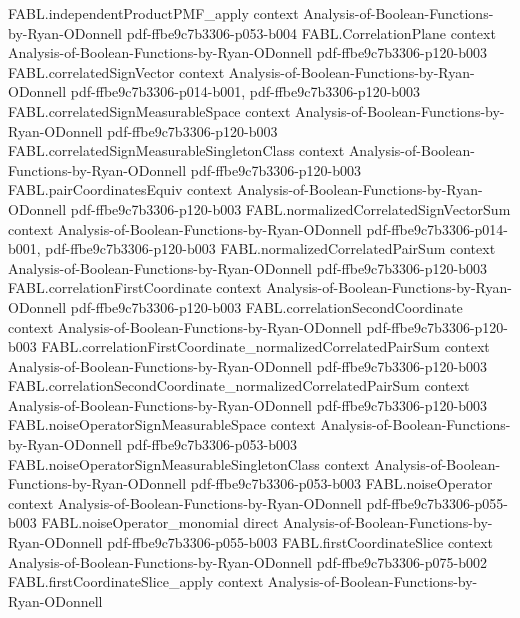 \begin{theorem}
\proofstep
  {FABL.independentProductPMF_apply}
  {context}
  {Analysis-of-Boolean-Functions-by-Ryan-ODonnell}
  {pdf-ffbe9c7b3306-p053-b004}
\proofstep
  {FABL.CorrelationPlane}
  {context}
  {Analysis-of-Boolean-Functions-by-Ryan-ODonnell}
  {pdf-ffbe9c7b3306-p120-b003}
\proofstep
  {FABL.correlatedSignVector}
  {context}
  {Analysis-of-Boolean-Functions-by-Ryan-ODonnell}
  {pdf-ffbe9c7b3306-p014-b001,
    pdf-ffbe9c7b3306-p120-b003}
\proofstep
  {FABL.correlatedSignMeasurableSpace}
  {context}
  {Analysis-of-Boolean-Functions-by-Ryan-ODonnell}
  {pdf-ffbe9c7b3306-p120-b003}
\proofstep
  {FABL.correlatedSignMeasurableSingletonClass}
  {context}
  {Analysis-of-Boolean-Functions-by-Ryan-ODonnell}
  {pdf-ffbe9c7b3306-p120-b003}
\proofstep
  {FABL.pairCoordinatesEquiv}
  {context}
  {Analysis-of-Boolean-Functions-by-Ryan-ODonnell}
  {pdf-ffbe9c7b3306-p120-b003}
\proofstep
  {FABL.normalizedCorrelatedSignVectorSum}
  {context}
  {Analysis-of-Boolean-Functions-by-Ryan-ODonnell}
  {pdf-ffbe9c7b3306-p014-b001,
    pdf-ffbe9c7b3306-p120-b003}
\proofstep
  {FABL.normalizedCorrelatedPairSum}
  {context}
  {Analysis-of-Boolean-Functions-by-Ryan-ODonnell}
  {pdf-ffbe9c7b3306-p120-b003}
\proofstep
  {FABL.correlationFirstCoordinate}
  {context}
  {Analysis-of-Boolean-Functions-by-Ryan-ODonnell}
  {pdf-ffbe9c7b3306-p120-b003}
\proofstep
  {FABL.correlationSecondCoordinate}
  {context}
  {Analysis-of-Boolean-Functions-by-Ryan-ODonnell}
  {pdf-ffbe9c7b3306-p120-b003}
\proofstep
  {FABL.correlationFirstCoordinate_normalizedCorrelatedPairSum}
  {context}
  {Analysis-of-Boolean-Functions-by-Ryan-ODonnell}
  {pdf-ffbe9c7b3306-p120-b003}
\proofstep
  {FABL.correlationSecondCoordinate_normalizedCorrelatedPairSum}
  {context}
  {Analysis-of-Boolean-Functions-by-Ryan-ODonnell}
  {pdf-ffbe9c7b3306-p120-b003}
\proofstep
  {FABL.noiseOperatorSignMeasurableSpace}
  {context}
  {Analysis-of-Boolean-Functions-by-Ryan-ODonnell}
  {pdf-ffbe9c7b3306-p053-b003}
\proofstep
  {FABL.noiseOperatorSignMeasurableSingletonClass}
  {context}
  {Analysis-of-Boolean-Functions-by-Ryan-ODonnell}
  {pdf-ffbe9c7b3306-p053-b003}
\proofstep
  {FABL.noiseOperator}
  {context}
  {Analysis-of-Boolean-Functions-by-Ryan-ODonnell}
  {pdf-ffbe9c7b3306-p055-b003}
\proofstep
  {FABL.noiseOperator_monomial}
  {direct}
  {Analysis-of-Boolean-Functions-by-Ryan-ODonnell}
  {pdf-ffbe9c7b3306-p055-b003}
\proofstep
  {FABL.firstCoordinateSlice}
  {context}
  {Analysis-of-Boolean-Functions-by-Ryan-ODonnell}
  {pdf-ffbe9c7b3306-p075-b002}
\proofstep
  {FABL.firstCoordinateSlice_apply}
  {context}
  {Analysis-of-Boolean-Functions-by-Ryan-ODonnell}

\end{theorem}
